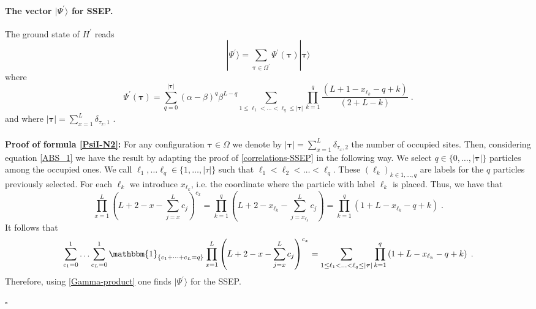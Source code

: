 \documentclass[10pt]{article}
\numberwithin{equation}{section}
\numberwithin{equation}{subsection}
\newcommand{\dt}{\;.}
\begin{document}
\paragraph{The vector $|\Psi^{'}\rangle$ for SSEP.} The ground state of $H^{'}$ reads
\begin{equation}
	|\Psi^{'}\rangle=\sum_{\bm{\tau}\in\Omega^{'}}\Psi^{'}(\bm{\tau})|\bm{\tau}\rangle
\end{equation}
where 
\begin{equation}\label{PsiI-N2}
	\Psi^{'}(\bm{\tau})=\sum_{q=0}^{|\bm{\tau}|}(\alpha-\beta)^{q}\beta^{L-q}\sum_{1\leq \ell_{1}<\ldots<\ell_{q}\leq |\bm{\tau}|}\prod_{k=1}^{q}\frac{\left(L+1-x_{\ell_{k}}-q+k\right)}{(2+L-k)}\dt
\end{equation}
and where $|\bm{\tau}|=\sum_{x=1}^{L}\delta_{\tau_{x},1}$ . \\ \\
 \textbf{Proof of formula \eqref{PsiI-N2}:}  For any configuration $\bm{\tau}\in \Omega$ we denote by  $|\bm{\tau}|=\sum_{x=1}^{L}\delta_{\tau_{x},2}$ the number of occupied sites. Then, considering equation \eqref{ABS_1} we have the result by adapting the proof of \eqref{correlations-SSEP} in the following way. We select $q\in\{0,\ldots,|\bm{\tau}|\}$ particles among the occupied ones. We call $\ell_{1},\ldots\ell_{q}\in \{1,\ldots,|\tau|\}$ such that $\ell_{1}<\ell_{2}<\ldots<\ell_{q}$. These $(\ell_{k})_{k\in {1,\ldots,q}}$ are labels for the $q$ particles previously selected. For each $\ell_{k}$ we introduce $x_{\ell_{k}}$, i.e. the coordinate where the particle with label $\ell_{k}$ is placed. Thus, we have that  
\begin{equation}
	\prod_{x=1}^{L}\left(L+2-x-\sum_{j=x}^{L}c_{j}\right)^{c_{x}}=\prod_{k=1}^{q}\left(L+2-x_{\ell_{k}}-\sum_{j=x_{\ell_{k}}}^{L}c_{j}\right)=\prod_{k=1}^{q}\left(1+L-x_{\ell_{k}}-q+k\right)\dt
\end{equation}
It follows that
\begin{equation}
	\sum_{c_{1}=0}^{1}\ldots\sum_{c_{L}=0}^{1}\mathbbm{1}_{\{c_{1}+\cdots+c_{L}=q\}}	\prod_{x=1}^{L}\left(L+2-x-\sum_{j=x}^{L}c_{j}\right)^{c_{x}}=\sum_{1\leq \ell_{1}<\ldots<\ell_{q}\leq |\bm{\tau}|}\prod_{k=1}^{q}\left(1+L-x_{\ell_{k}}-q+k\right)\dt
\end{equation} 
Therefore, using \eqref{Gamma-product}  one finds $|\Psi^{'}\rangle$ for the SSEP.
\begin{flushright}
	$\square$
\end{flushright}
\end{document}
